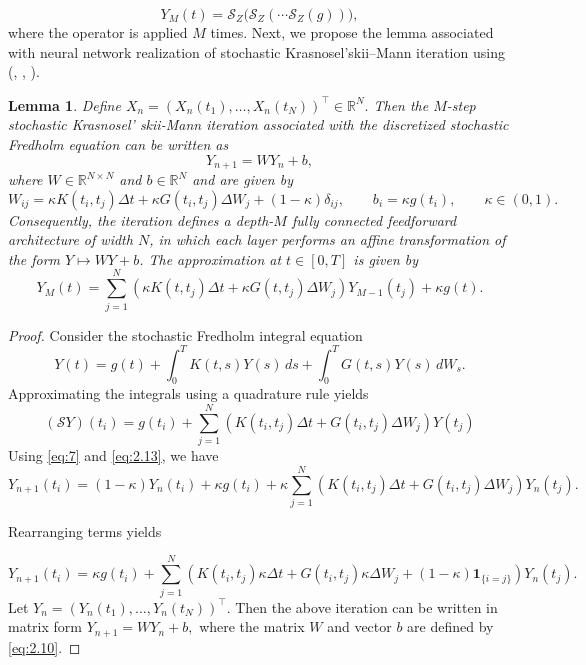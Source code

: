 \documentclass[preprint,12pt,authoryear]{elsarticle}
\newtheorem{lemma}{Lemma}
\begin{document}
\begin{equation}
	Y_M(t)
	=
	\mathcal{S}_Z
	\Big(
	\mathcal{S}_Z(
	\cdots
	\mathcal{S}_Z(g)
	)
	\Big),
	\label{eq:3.2}
\end{equation}
where the operator is applied $M$ times. Next, we propose the lemma associated with neural network realization of stochastic Krasnosel'skii--Mann iteration using (\cite{KloedenPlaten1992}, \cite{Krasnoselskii1955},  \cite{Mann1953}). \\
\begin{lemma}
Define $ X_n=(X_n(t_1),\ldots,X_n(t_N))^\top \in \mathbb{R}^N.$
Then the $M$-step stochastic Krasnosel' skii-Mann iteration associated with the discretized stochastic Fredholm equation can be written as
\begin{equation}
Y_{n+1}=WY_n+b ,
\label{eq:2.9}
\end{equation}
where $W\in\mathbb{R}^{N\times N}$ and $b\in\mathbb{R}^N$ and are given by
\begin{equation}
W_{ij}
=
\kappa K(t_i,t_j)\Delta t
+
\kappa G(t_i,t_j)\Delta W_j
+
(1-\kappa)\delta_{ij},
\qquad
b_i=\kappa g(t_i), \qquad\kappa\in(0,1).
\label{eq:2.10}
\end{equation}
Consequently, the iteration defines a depth-$M$ fully connected
feedforward architecture of width $N$, in which each layer performs
an affine transformation of the form $Y \mapsto WY+b$.
The approximation at $t\in[0,T]$ is given by
\begin{equation}
Y_M(t)
=
\sum_{j=1}^{N}
\left(
\kappa K(t,t_j)\Delta t
+
\kappa G(t,t_j)\Delta W_j
\right)Y_{M-1}(t_j)
+
\kappa g(t).
\label{eq:2.11}
\end{equation}
\end{lemma}
\begin{proof}
Consider the stochastic Fredholm integral equation
\begin{equation}
Y(t)
=
g(t)
+
\int_0^T K(t,s)Y(s)\,ds
+
\int_0^T G(t,s)Y(s)\,dW_s.
\label{eq:2.12}
\end{equation}
Approximating the integrals using a quadrature rule yields
\begin{equation}
(\mathcal{S}Y)(t_i)
=
g(t_i)
+
\sum_{j=1}^{N}
\left(
K(t_i,t_j)\Delta t
+
G(t_i,t_j)\Delta W_j
\right)Y(t_j)
\label{eq:2.13}
\end{equation}
Using \eqref{eq:7} and \eqref{eq:2.13}, we have
\begin{equation}
Y_{n+1}(t_i)
=
(1-\kappa)Y_n(t_i)
+
\kappa g(t_i)
+
\kappa
\sum_{j=1}^{N}
\left(
K(t_i,t_j)\Delta t
+
G(t_i,t_j)\Delta W_j
\right)Y_n(t_j).
\label{eq:2.14}
\end{equation}

Rearranging terms yields

\begin{equation}
Y_{n+1}(t_i)
=
\kappa g(t_i)
+
\sum_{j=1}^{N}
\left(
K(t_i,t_j)\kappa\Delta t
+
G(t_i,t_j)\kappa\Delta W_j
+
(1-\kappa)\mathbf{1}_{\{i=j\}}
\right)Y_n(t_j).
\label{eq:2.15}
\end{equation}
Let $ Y_n=(Y_n(t_1),\dots,Y_n(t_N))^\top.$
Then the above iteration can be written in matrix form
$ Y_{n+1}=W Y_n + b,$ where the matrix $W$ and vector $b$ are defined by \eqref{eq:2.10}.
\end{proof}
\end{document}
